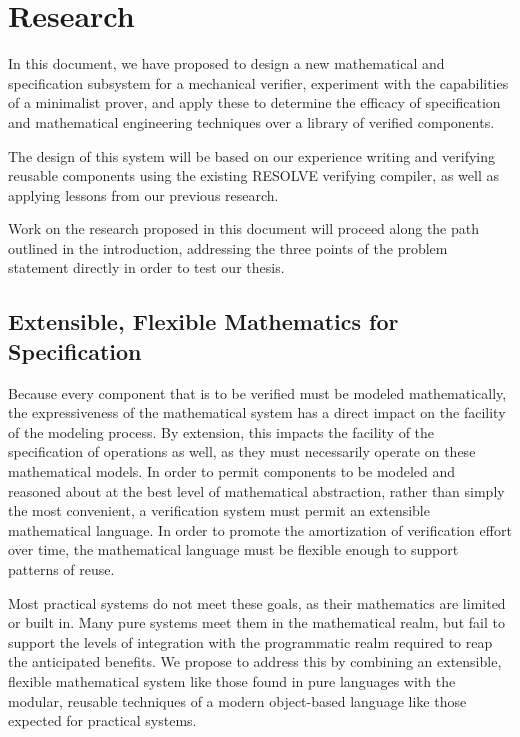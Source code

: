 \chapter{Research}\label{sec:research}
In this document, we have proposed to design a new mathematical and specification subsystem for a mechanical verifier, experiment with the capabilities of a minimalist prover, and apply these to determine the efficacy of specification and mathematical engineering techniques over a library of verified components.

The design of this system will be based on our experience writing and verifying reusable components using the existing RESOLVE verifying compiler, as well as applying lessons from our previous research.

Work on the research proposed in this document will proceed along the path outlined in the introduction, addressing the three points of the problem statement directly in order to test our thesis.

\section{Extensible, Flexible Mathematics for Specification}
Because every component that is to be verified must be modeled mathematically, the expressiveness of the mathematical system has a direct impact on the facility of the modeling process.  By extension, this impacts the facility of the specification of operations as well, as they must necessarily operate on these mathematical models.  In order to permit components to be modeled and reasoned about at the best level of mathematical abstraction, rather than simply the most convenient, a verification system must permit an extensible mathematical language.  In order to promote the amortization of verification effort over time, the mathematical language must be flexible enough to support patterns of reuse.

Most practical systems do not meet these goals, as their mathematics are limited or built in.  Many pure systems meet them in the mathematical realm, but fail to support the levels of integration with the programmatic realm required to reap the anticipated benefits.  We propose to address this by combining an extensible, flexible mathematical system like those found in pure languages with the modular, reusable techniques of a modern object-based language like those expected for practical systems.

